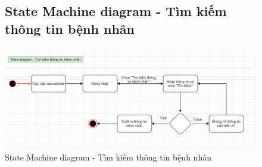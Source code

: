\documentclass{report}
\begin{document}
\pagebreak
\begin{center}
	\begin{figure}[!htp]
		\subsection{State Machine diagram - Tìm kiếm thông tin bệnh nhân}
		\begin{center}
			\includegraphics[scale=.6]{Hinh/State Machine diagram Tìm kiếm thông tin bệnh nhân.png}
		\end{center}
		\caption{State Machine diagram - Tìm kiếm thông tin bệnh nhân}
	\end{figure}
\end{center}


\pagebreak
\end{document}
